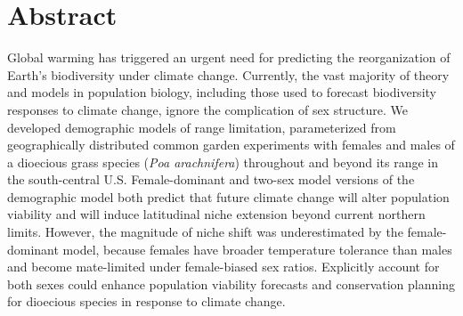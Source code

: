 \documentclass[12pt]{article}
\begin{document}
\section*{Abstract}
Global warming has triggered an urgent need for predicting the reorganization of Earth's biodiversity under climate change.
Currently, the vast majority of theory and models in population biology, including those used to forecast biodiversity responses to climate change, ignore the complication of sex structure. 
We developed demographic models of range limitation, parameterized from geographically distributed common garden experiments with females and males of a dioecious grass species (\textit{Poa arachnifera}) throughout and beyond its range in the south-central U.S. 
Female-dominant and two-sex model versions of the demographic model both predict that future climate change will alter population viability and will induce latitudinal niche extension beyond current northern limits.
However, the magnitude of niche shift was underestimated by the female-dominant model, because females have broader temperature tolerance than males and become mate-limited under female-biased sex ratios.
Explicitly account for both sexes could enhance population viability forecasts and conservation planning for dioecious species in response to climate change.

\newpage
\end{document}
